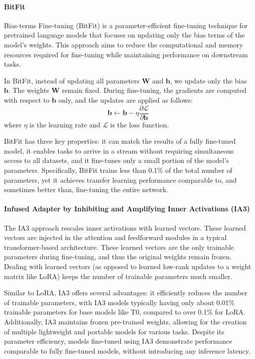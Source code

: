 \paragraph{BitFit} 
Bias-terms Fine-tuning (BitFit) \cite{zaken2022bitfit} is a parameter-efficient fine-tuning technique for pretrained language models that focuses on updating only the bias terms of the model's weights. This approach aims to reduce the computational and memory resources required for fine-tuning while maintaining performance on downstream tasks.

In BitFit, instead of updating all parameters $\mathbf{W}$ and $\mathbf{b}$, we update only the bias $\mathbf{b}$. The weights $\mathbf{W}$ remain fixed. During fine-tuning, the gradients are computed with respect to $\mathbf{b}$ only, and the updates are applied as follows:
\[
\mathbf{b} \leftarrow \mathbf{b} - \eta \frac{\partial \mathcal{L}}{\partial \mathbf{b}}
\]
where $\eta$ is the learning rate and $\mathcal{L}$ is the loss function.

BitFit has three key properties: it can match the results of a fully fine-tuned model, it enables tasks to arrive in a stream without requiring simultaneous access to all datasets, and it fine-tunes only a small portion of the model's parameters. Specifically, BitFit trains less than 0.1\% of the total number of parameters, yet it achieves transfer learning performance comparable to, and sometimes better than, fine-tuning the entire network.

\paragraph{Infused Adapter by Inhibiting and Amplifying Inner Activations (IA3)} The IA3 approach rescales inner activations with learned vectors. These learned vectors are injected in the attention and feedforward modules in a typical transformer-based architecture. These learned vectors are the only trainable parameters during fine-tuning, and thus the original weights remain frozen. Dealing with learned vectors (as opposed to learned low-rank updates to a weight matrix like LoRA) keeps the number of trainable parameters much smaller.

Similar to LoRA, IA3 offers several advantages: it efficiently reduces the number of trainable parameters, with IA3 models typically having only about 0.01\% trainable parameters for base models like T0, compared to over 0.1\% for LoRA. Additionally, IA3 maintains frozen pre-trained weights, allowing for the creation of multiple lightweight and portable models for various tasks. Despite its parameter efficiency, models fine-tuned using IA3 demonstrate performance comparable to fully fine-tuned models, without introducing any inference latency.